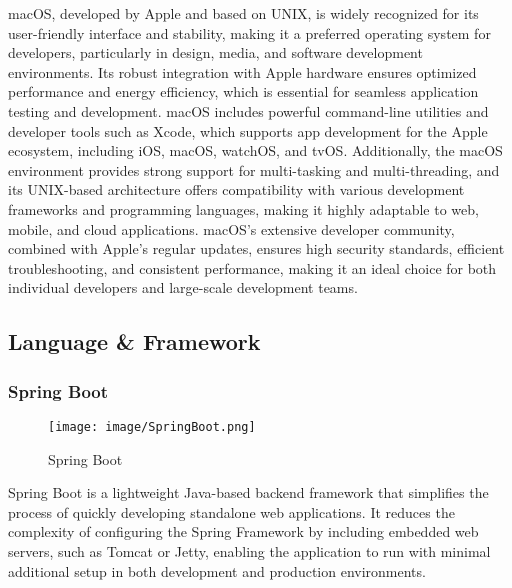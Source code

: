 \documentclass[conference]{IEEEtran}
\begin{document}
\noindent macOS, developed by Apple and based on UNIX, is widely recognized for its user-friendly interface and stability, making it a preferred operating system for developers, particularly in design, media, and software development environments. Its robust integration with Apple hardware ensures optimized performance and energy efficiency, which is essential for seamless application testing and development. macOS includes powerful command-line utilities and developer tools such as Xcode, which supports app development for the Apple ecosystem, including iOS, macOS, watchOS, and tvOS. Additionally, the macOS environment provides strong support for multi-tasking and multi-threading, and its UNIX-based architecture offers compatibility with various development frameworks and programming languages, making it highly adaptable to web, mobile, and cloud applications. macOS’s extensive developer community, combined with Apple’s regular updates, ensures high security standards, efficient troubleshooting, and consistent performance, making it an ideal choice for both individual developers and large-scale development teams. \\



\subsection{Language \& Framework}

\subsubsection{Spring Boot}

\begin{figure}[h!]
    \centering
    \texttt{[image: image/SpringBoot.png]}
    \caption{Spring Boot}
    \label{fig:enter-label}
\end{figure}

\noindent Spring Boot is a lightweight Java-based backend framework that simplifies the process of quickly developing standalone web applications. It reduces the complexity of configuring the Spring Framework by including embedded web servers, such as Tomcat or Jetty, enabling the application to run with minimal additional setup in both development and production environments.\\
\end{document}
